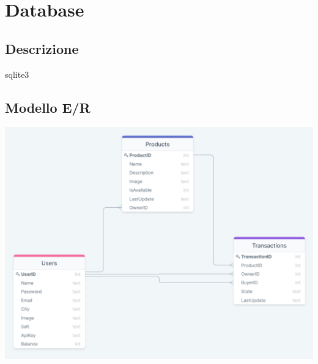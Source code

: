 \section{Database}
\subsection{Descrizione}
sqlite3
\subsection{Modello E/R}
\begin{center}
    \includegraphics[scale=0.28]{images/modello_e_r.png}
\end{center}
